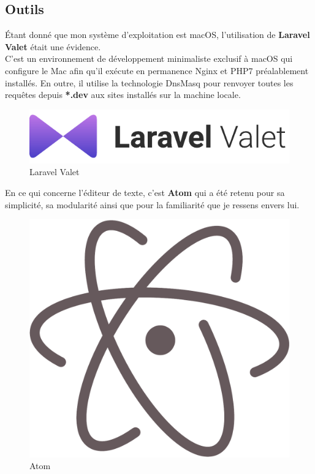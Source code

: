 \newpage

\subsection{Outils}
\label{subsec:tools}
Étant donné que mon système d'exploitation est macOS, l'utilisation de \textbf{Laravel Valet} était une évidence.\\
C'est un environnement de développement minimaliste exclusif à macOS qui configure le Mac afin qu'il exécute en permanence Nginx et PHP7 préalablement installés. En outre, il utilise la technologie DnsMasq pour renvoyer toutes les requêtes depuis \textbf{*.dev} aux sites installés sur la machine locale. 

\vspace{0.5cm}

\begin{figure}[h]
  \centering
  \includegraphics[scale=1.3]
  {textures/images/tools/laravelValet.pdf}
  \caption{Laravel Valet}
  \label{fig:laravel_valet}
\end{figure}

En ce qui concerne l'éditeur de texte, c'est \textbf{Atom} qui a été retenu pour sa simplicité, sa modularité ainsi que pour la familiarité que je ressens envers lui. 

\vspace{0.5cm}

\begin{figure}[h]
  \centering
  \includegraphics[scale=0.15]
  {textures/images/tools/atom.pdf}
  \caption{Atom}
  \label{fig:atom}
\end{figure}

